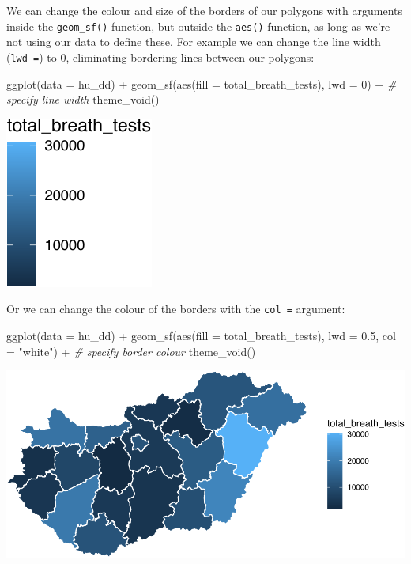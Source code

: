 \documentclass[
  krantz2]{krantz}
\makeatletter
\newenvironment{Shaded}{\begin{snugshade}}{\end{snugshade}}
\newcommand{\AttributeTok}[1]{\textcolor[rgb]{0.61,0.61,0.61}{#1}}
\newcommand{\CommentTok}[1]{\textcolor[rgb]{0.37,0.37,0.37}{\textit{#1}}}
\newcommand{\DecValTok}[1]{\textcolor[rgb]{0.06,0.06,0.06}{#1}}
\newcommand{\FloatTok}[1]{\textcolor[rgb]{0.06,0.06,0.06}{#1}}
\newcommand{\FunctionTok}[1]{\textcolor[rgb]{0,0,0}{#1}}
\newcommand{\NormalTok}[1]{#1}
\newcommand{\SpecialCharTok}[1]{\textcolor[rgb]{0,0,0}{#1}}
\newcommand{\StringTok}[1]{\textcolor[rgb]{0.5,0.5,0.5}{#1}}
\newenvironment{kframe}{%
\medskip{}
\setlength{\fboxsep}{.8em}
 \def\at@end@of@kframe{}%
 \ifinner\ifhmode%
  \def\at@end@of@kframe{\end{minipage}}%
  \begin{minipage}{\columnwidth}%
 \fi\fi%
 \def\FrameCommand##1{\hskip\@totalleftmargin \hskip-\fboxsep
 \colorbox{shadecolor}{##1}\hskip-\fboxsep
     \hskip-\linewidth \hskip-\@totalleftmargin \hskip\columnwidth}%
 \MakeFramed {\advance\hsize-\width
   \@totalleftmargin\z@ \linewidth\hsize
   \@setminipage}}%
 {\par\unskip\endMakeFramed%
 \at@end@of@kframe}
\renewenvironment{Shaded}{\begin{kframe}}{\end{kframe}}
\makeatother
\begin{document}
We can change the colour and size of the borders of our polygons with arguments inside the \texttt{geom\_sf()} function, but outside the \texttt{aes()} function, as long as we're not using our data to define these. For example we can change the line width (\texttt{lwd\ =}) to 0, eliminating bordering lines between our polygons:

\begin{Shaded}
\begin{Highlighting}[]
\FunctionTok{ggplot}\NormalTok{(}\AttributeTok{data =}\NormalTok{ hu\_dd) }\SpecialCharTok{+} 
  \FunctionTok{geom\_sf}\NormalTok{(}\FunctionTok{aes}\NormalTok{(}\AttributeTok{fill =}\NormalTok{ total\_breath\_tests), }
          \AttributeTok{lwd =} \DecValTok{0}\NormalTok{) }\SpecialCharTok{+}  \CommentTok{\# specify line width}
  \FunctionTok{theme\_void}\NormalTok{()}
\end{Highlighting}
\end{Shaded}

\includegraphics{crime_mapping_files/figure-latex/themmapnobord-1.pdf}

Or we can change the colour of the borders with the \texttt{col\ =} argument:

\begin{Shaded}
\begin{Highlighting}[]
\FunctionTok{ggplot}\NormalTok{(}\AttributeTok{data =}\NormalTok{ hu\_dd) }\SpecialCharTok{+} 
  \FunctionTok{geom\_sf}\NormalTok{(}\FunctionTok{aes}\NormalTok{(}\AttributeTok{fill =}\NormalTok{ total\_breath\_tests), }
          \AttributeTok{lwd =} \FloatTok{0.5}\NormalTok{, }
          \AttributeTok{col =} \StringTok{"white"}\NormalTok{) }\SpecialCharTok{+} \CommentTok{\# specify border colour}
  \FunctionTok{theme\_void}\NormalTok{()}
\end{Highlighting}
\end{Shaded}

\includegraphics{crime_mapping_files/figure-latex/themmapwhitebord-1.pdf}
\end{document}
